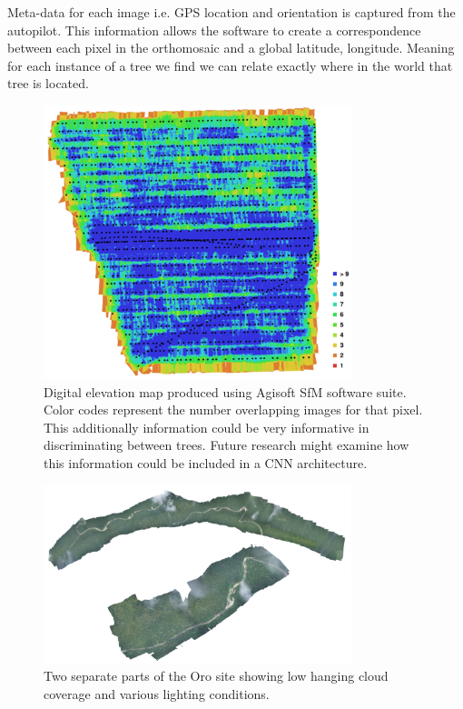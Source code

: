 Meta-data for each image i.e. GPS location and orientation is captured from the autopilot. This information allows the software to create a correspondence between each pixel in the orthomosaic and a global latitude, longitude. Meaning for each instance of a tree we find we can relate exactly where in the world that tree is located.

\begin{figure}[ht]
\includegraphics[width=0.8\textwidth]{Figures/BFREE-DEM.png}
\caption{Digital elevation map produced using Agisoft SfM software suite. Color codes represent the number overlapping images for that pixel. This additionally information could be very informative in discriminating between trees. Future research might examine how this information could be included in a CNN architecture.}
\label{fig:BFEE-DEM}
\end{figure}

\begin{figure}[ht]
\includegraphics[width=0.8\textwidth]{Figures/OroClouds.png}
\caption{Two separate parts of the Oro site showing low hanging cloud coverage and various lighting conditions.}
\label{fig:OroClouds}
\end{figure}
